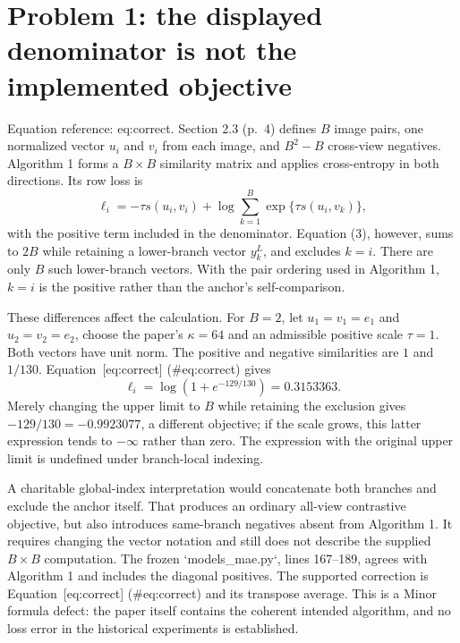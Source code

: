 \documentclass[10pt]{article}
\begin{document}
\section*{Problem 1: the displayed denominator is not the implemented objective}
Equation reference: eq:correct. Section 2.3 (p. 4) defines \(B\) image pairs, one normalized vector \(u_i\) and \(v_i\) from each image, and \(B^2-B\) cross-view negatives. Algorithm 1 forms a \(B\times B\) similarity matrix and applies cross-entropy in both directions. Its row loss is \[
 \ell_i=-\tau s(u_i,v_i)+\log\sum_{k=1}^{B}\exp\{\tau s(u_i,v_k)\},\] with the positive term included in the denominator. Equation (3), however, sums to \(2B\) while retaining a lower-branch vector \(y_k^L\), and excludes \(k=i\). There are only \(B\) such lower-branch vectors. With the pair ordering used in Algorithm 1, \(k=i\) is the positive rather than the anchor’s self-comparison.\par
These differences affect the calculation. For \(B=2\), let \(u_1=v_1=e_1\) and \(u_2=v_2=e_2\), choose the paper’s \(\kappa=64\) and an admissible positive scale \(\tau=1\). Both vectors have unit norm. The positive and negative similarities are \(1\) and \(1/130\). Equation [eq:correct] (\#eq:correct) gives \[\ell_i=\log(1+e^{-129/130})=0.3153363.\] Merely changing the upper limit to \(B\) while retaining the exclusion gives \(-129/130=-0.9923077\), a different objective; if the scale grows, this latter expression tends to \(-\infty\) rather than zero. The expression with the original upper limit is undefined under branch-local indexing.\par
A charitable global-index interpretation would concatenate both branches and exclude the anchor itself. That produces an ordinary all-view contrastive objective, but also introduces same-branch negatives absent from Algorithm 1. It requires changing the vector notation and still does not describe the supplied \(B\times B\) computation. The frozen `models\_mae.py`, lines 167–189, agrees with Algorithm 1 and includes the diagonal positives. The supported correction is Equation [eq:correct] (\#eq:correct) and its transpose average. This is a Minor formula defect: the paper itself contains the coherent intended algorithm, and no loss error in the historical experiments is established.\par
\end{document}
